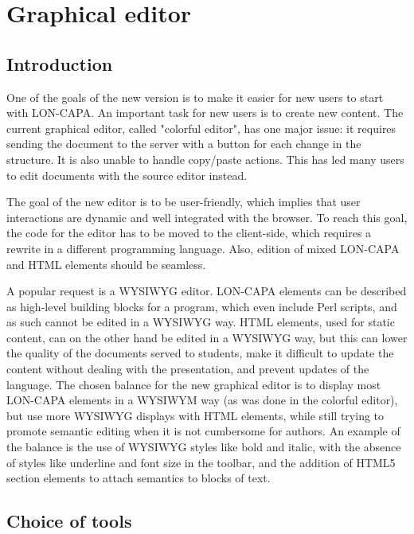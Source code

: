 \chapter{Graphical editor}\label{graphical_editor}

\section{Introduction}

One of the goals of the new version is to make it easier for new users to start with LON-CAPA. An important task for new users is to create new content. The current graphical editor, called "colorful editor", has one major issue: it requires sending the document to the server with a button for each change in the structure. It is also unable to handle copy/paste actions. This has led many users to edit documents with the source editor instead.

The goal of the new editor is to be user-friendly, which implies that user interactions are dynamic and well integrated with the browser. To reach this goal, the code for the editor has to be moved to the client-side, which requires a rewrite in a different programming language. Also, edition of mixed LON-CAPA and HTML elements should be seamless.

A popular request is a WYSIWYG editor. LON-CAPA elements can be described as high-level building blocks for a program, which even include Perl scripts, and as such cannot be edited in a WYSIWYG way. HTML elements, used for static content, can on the other hand be edited in a WYSIWYG way, but this can lower the quality of the documents served to students, make it difficult to update the content without dealing with the presentation, and prevent updates of the language. The chosen balance for the new graphical editor is to display most LON-CAPA elements in a WYSIWYM way (as was done in the colorful editor), but use more WYSIWYG displays with HTML elements, while still trying to promote semantic editing when it is not cumbersome for authors.
An example of the balance is the use of WYSIWYG styles like bold and italic, with the absence of styles like underline and font size in the toolbar, and the addition of HTML5 section elements to attach semantics to blocks of text.


\section{Choice of tools}

